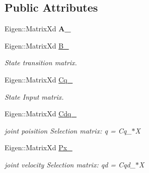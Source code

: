 \subsection*{Public Attributes}
\begin{DoxyCompactItemize}
\item 
\mbox{\label{structrobot_1_1_m_p_c__param_af91cc4c415cdf7539612eda872c34aeb}} 
Eigen\+::\+Matrix\+Xd {\bfseries A\+\_\+}
\item 
\mbox{\label{structrobot_1_1_m_p_c__param_a43d48b2441a74c96307629784428ee22}} 
Eigen\+::\+Matrix\+Xd \hyperlink{structrobot_1_1_m_p_c__param_a43d48b2441a74c96307629784428ee22}{B\+\_\+}
\begin{DoxyCompactList}\small\item\em State transition matrix. \end{DoxyCompactList}\item 
\mbox{\label{structrobot_1_1_m_p_c__param_ab3ab625b08ba98c54dd54d805aeb35b5}} 
Eigen\+::\+Matrix\+Xd \hyperlink{structrobot_1_1_m_p_c__param_ab3ab625b08ba98c54dd54d805aeb35b5}{Cq\+\_\+}
\begin{DoxyCompactList}\small\item\em State Input matrix. \end{DoxyCompactList}\item 
\mbox{\label{structrobot_1_1_m_p_c__param_a33628bcfdc4502cc9a7a267ce3a500a7}} 
Eigen\+::\+Matrix\+Xd \hyperlink{structrobot_1_1_m_p_c__param_a33628bcfdc4502cc9a7a267ce3a500a7}{Cdq\+\_\+}
\begin{DoxyCompactList}\small\item\em joint poisition Selection matrix\+: q = Cq\+\_\+$\ast$X \end{DoxyCompactList}\item 
\mbox{\label{structrobot_1_1_m_p_c__param_a30b38fba109124cd94ba8756fede2d5b}} 
Eigen\+::\+Matrix\+Xd \hyperlink{structrobot_1_1_m_p_c__param_a30b38fba109124cd94ba8756fede2d5b}{Px\+\_\+}
\begin{DoxyCompactList}\small\item\em joint velocity Selection matrix\+: qd = Cqd\+\_\+$\ast$X \end{DoxyCompactList}\item 

\end{DoxyCompactItemize}
